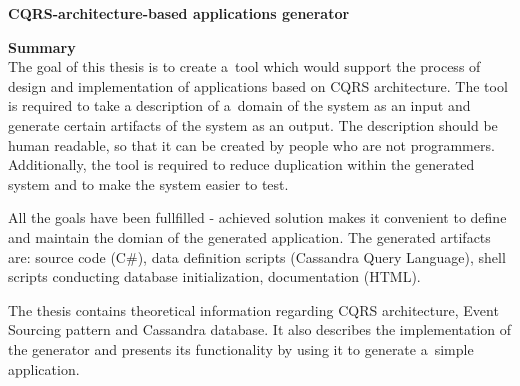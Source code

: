 
\begin{center}
 \large \textbf{CQRS-architecture-based applications generator}
\end{center}

\vspace*{1cm}

\textbf{Summary} \\

The goal of this thesis is to create a~tool which would support the process of design and implementation of applications based on CQRS architecture.
The tool is required to take a description of a~domain of the system as an input and generate certain artifacts of the system as an output.
The description should be human readable, so that it can be created by people who are not programmers.
Additionally, the tool is required to reduce duplication within the generated system and to make the system easier to test.

All the goals have been fullfilled - achieved solution makes it convenient to define and maintain the domian of the generated application.
The generated artifacts are: source code (C\#), data definition scripts (Cassandra Query Language), shell scripts conducting database initialization, documentation (HTML).

The thesis contains theoretical information regarding CQRS architecture, Event Sourcing pattern and Cassandra database.
It also describes the implementation of the generator and presents its functionality by using it to generate a~simple application.


